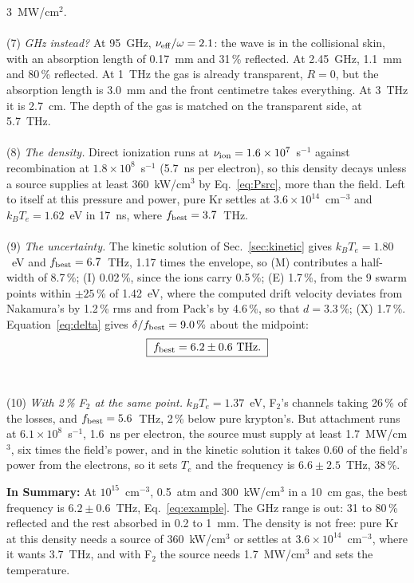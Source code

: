 \documentclass[11pt]{article}
\numberwithin{equation}{section}
\newcommand{\nueff}{\nu_{\rm eff}}
\newcommand{\kB}{k_B}
\newcommand{\fbest}{f_{\rm best}}
\newcommand{\Te}{T_e}
\begin{document}
3~MW/cm$^2$.
\\ \\
{\noindent}(7) \emph{GHz instead?} At 95~GHz, $\nueff/\omega=2.1$: the wave is in the collisional
skin, with an absorption length of 0.17~mm and 31\,\% reflected. At 2.45~GHz, 1.1~mm and 80\,\%
reflected. At 1~THz the gas is already transparent, $R=0$, but the absorption length is 3.0~mm and
the front centimetre takes everything. At 3~THz it is 2.7~cm. The depth of the gas is matched on
the transparent side, at 5.7~THz.
\\ \\
{\noindent}(8) \emph{The density.} Direct ionization runs at $\nu_{\rm ion}=1.6\times10^{7}$~s$^{-1}$
against recombination at $1.8\times10^{8}$~s$^{-1}$ (5.7~ns per electron), so this density decays
unless a source supplies at least 360~kW/cm$^3$ by Eq.~\eqref{eq:Psrc}, more than the field. Left to
itself at this pressure and power, pure Kr settles at $3.6\times10^{14}$~cm$^{-3}$ and
$\kB\Te=1.62$~eV in 17~ns, where $\fbest=3.7$~THz.
\\ \\
{\noindent}(9) \emph{The uncertainty.} The kinetic solution of Sec.~\ref{sec:kinetic} gives
$\kB\Te=1.80$~eV and $\fbest=6.7$~THz, 1.17 times the envelope, so (M) contributes a half-width
of 8.7\,\%; (I) 0.02\,\%, since the ions carry 0.5\,\%; (E) 1.7\,\%, from the 9 swarm points within
$\pm25$\,\% of 1.42~eV, where the computed drift velocity deviates from Nakamura's by 1.2\,\% rms and
from Pack's by 4.6\,\%, so that $d=3.3\,\%$; (X) 1.7\,\%. Equation~\eqref{eq:delta} gives
$\delta/\fbest=9.0\,\%$ about the midpoint:
\begin{equation}
\boxed{\;\fbest=6.2\pm0.6~{\rm THz}.\;}
\label{eq:example}
\end{equation}
\\ \\
{\noindent}(10) \emph{With 2\,\% F$_2$ at the same point.} $\kB\Te=1.37$~eV, F$_2$'s channels taking
26\,\% of the losses, and $\fbest=5.6$~THz, 2\,\% below pure krypton's. But attachment runs at
$6.1\times10^{8}$~s$^{-1}$, 1.6~ns per electron, the source must supply at least 1.7~MW/cm$^3$, six
times the field's power, and in the kinetic solution it takes 0.60 of the field's power from the
electrons, so it sets $\Te$ and the frequency is $6.6\pm2.5$~THz, 38\,\%.

\medskip
\noindent\textbf{In Summary:} At $10^{15}$~cm$^{-3}$, 0.5~atm and 300~kW/cm$^3$ in a 10~cm gas, the
best frequency is $6.2\pm0.6$~THz, Eq.~\eqref{eq:example}. The GHz range is out: 31 to 80\,\%
reflected and the rest absorbed in 0.2 to 1~mm. The density is not free: pure Kr at this
density needs a source of 360~kW/cm$^3$ or settles at $3.6\times10^{14}$~cm$^{-3}$, where it wants
3.7~THz, and with F$_2$ the source needs 1.7~MW/cm$^3$ and sets the temperature.
\end{document}
